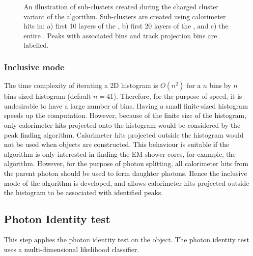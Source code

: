 \begin{figure}[tbph]
\begin{subfigure}[b]{0.65\textwidth}
    \caption{}
    \label{fig:photon2DpeakCharge3}
  \end{subfigure}
\caption
{An illustration of sub-clusters created during the charged cluster variant of the \peakFinding algorithm. Sub-clusters are created using calorimeter hits in: a) first 10 layers of the \ECAL, b) first 20 layers of the \ECAL, and c) the entire \ECAL. Peaks with associated bins and track projection bins are labelled.}
\label{fig:photon2DpeakCharge}
\end{figure}


\subsubsection{Inclusive mode}
\label{sec:photonPeakFindingInclusive}


The time complexity of iterating a 2D histogram is $O(n^2)$ for a $n$ bins by  $n$ bins sized histogram (default $n = 41$). Therefore, for the purpose of speed, it is undesirable to have  a large number of bins. Having a small finite-sized histogram speeds up the computation. However, because of the finite size of the histogram, only  calorimeter hits  projected onto the histogram would be considered by the peak finding algorithm. Calorimeter hits projected outside the histogram would not be used when \ShowerPeak objects are constructed. This behaviour is suitable if the algorithm is only interested in finding the EM shower cores, for example, the \PhotonReconstruction algorithm. However, for the purpose of photon splitting, all calorimeter hits from the parent photon should be used to form daughter photons. Hence the inclusive mode of the \peakFinding algorithm is developed, and allows calorimeter hits projected outside the histogram to be associated with identified peaks.



\subsection{Photon Identity test}
\label{sec:photonIDtest}

This step applies the photon identity test on the \ShowerPeak object. The photon identity test uses  a multi-dimensional likelihood classifier.



